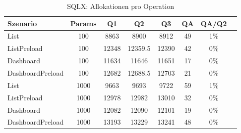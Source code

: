 \begin{table}[ht]
\centering
\caption{SQLX: Allokationen pro Operation}
\begin{tabular}{lccccccc}
\toprule
Szenario & Params & Q1 & Q2 & Q3 & QA & QA/Q2 \\
\midrule
	List & 100 & 8863 & 8900 & 8912 & 49 & 1\% \\
	ListPreload & 100 & 12348 & 12359.5 & 12390 & 42 & 0\% \\
	Dashboard & 100 & 11634 & 11646 & 11651 & 17 & 0\% \\
	DashboardPreload & 100 & 12682 & 12688.5 & 12703 & 21 & 0\% \\
	List & 1000 & 9663 & 9693 & 9722 & 59 & 1\% \\
	ListPreload & 1000 & 12978 & 12982 & 13010 & 32 & 0\% \\
	Dashboard & 1000 & 12082 & 12090 & 12101 & 19 & 0\% \\
	DashboardPreload & 1000 & 13193 & 13229 & 13241 & 48 & 0\% \\
\bottomrule
\end{tabular}
\label{tab:benchmark_sqlx_allocsperop}
\end{table}
	